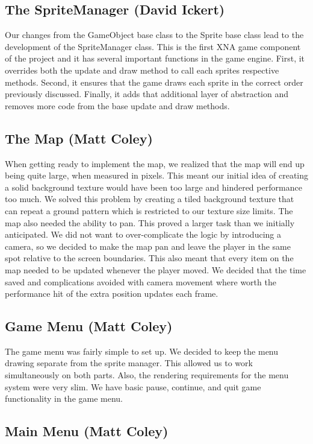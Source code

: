 \documentclass[]{article}
\begin{document}
		\subsection{The SpriteManager (David Ickert)}
			Our changes from the GameObject base class to the Sprite base class lead to the development of the SpriteManager class.  This is the first XNA game component of the project and it has several important functions in the game engine.  First, it overrides both the update and draw method to call each sprites respective methods.  Second, it ensures that the game draws each sprite in the correct order previously discussed.  Finally, it adds that additional layer of abstraction and removes more code from the base update and draw methods.
		\subsection{The Map (Matt Coley)}
			When getting ready to implement the map, we realized that the map will end up being quite large, when measured in pixels.  This meant our initial idea of creating a solid background texture would have been too large and hindered performance too much.  We solved this problem by creating a tiled background texture that can repeat a ground pattern which is restricted to our texture size limits.  The map also needed the ability to pan.  This proved a larger task than we initially anticipated.  We did not want to over-complicate the logic by introducing a camera, so we decided to make the map pan and leave the player in the same spot relative to the screen boundaries.  This also meant that every item on the map needed to be updated whenever the player moved.  We decided that the time saved and complications avoided with camera movement where worth the performance hit of the extra position updates each frame.
		\subsection{Game Menu (Matt Coley)}
			The game menu was fairly simple to set up.  We decided to keep the menu drawing separate from the sprite manager.  This allowed us to work simultaneously on both parts.  Also, the rendering requirements for the menu system were very slim.  We have basic pause, continue, and quit game functionality in the game menu.
		\subsection{Main Menu (Matt Coley)}
			
			
\end{document}
